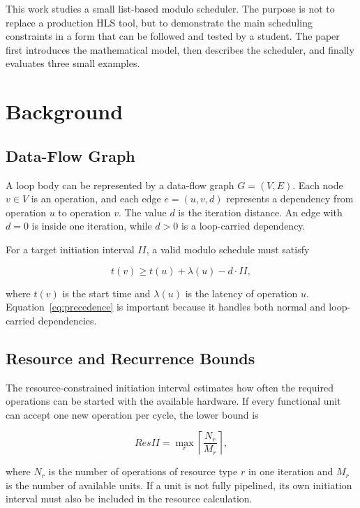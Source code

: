 \documentclass[conference]{IEEEtran}
\begin{document}
This work studies a small list-based modulo scheduler. The purpose is not to
replace a production HLS tool, but to demonstrate the main scheduling constraints
in a form that can be followed and tested by a student. The paper first introduces
the mathematical model, then describes the scheduler, and finally evaluates three
small examples.

\section{Background}

\subsection{Data-Flow Graph}

A loop body can be represented by a data-flow graph
$G=(V,E)$. Each node $v\in V$ is an operation, and each edge
$e=(u,v,d)$ represents a dependency from operation $u$ to operation $v$.
The value $d$ is the iteration distance. An edge with $d=0$ is inside one
iteration, while $d>0$ is a loop-carried dependency.

For a target initiation interval $II$, a valid modulo schedule must satisfy

\begin{equation}
t(v) \geq t(u)+\lambda(u)-d\cdot II ,
\label{eq:precedence}
\end{equation}

where $t(v)$ is the start time and $\lambda(u)$ is the latency of operation $u$.
Equation~\eqref{eq:precedence} is important because it handles both normal and
loop-carried dependencies.

\subsection{Resource and Recurrence Bounds}

The resource-constrained initiation interval estimates how often the required
operations can be started with the available hardware. If every functional unit
can accept one new operation per cycle, the lower bound is

\begin{equation}
ResII = \max_r \left\lceil \frac{N_r}{M_r} \right\rceil ,
\label{eq:resii}
\end{equation}

where $N_r$ is the number of operations of resource type $r$ in one iteration and
$M_r$ is the number of available units. If a unit is not fully pipelined, its own
initiation interval must also be included in the resource calculation.
\end{document}
